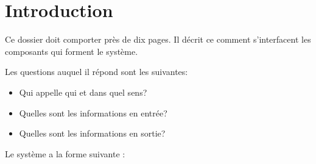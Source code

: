 \section{Introduction}

Ce dossier doit comporter près de dix pages. Il décrit ce comment s’interfacent les composants qui forment le système.

Les questions auquel il répond sont les suivantes:

\begin{itemize}
\item Qui appelle qui et dans quel sens?
\item Quelles sont les informations en entrée?
\item Quelles sont les informations en sortie?
\end{itemize}

Le système a la forme suivante :


